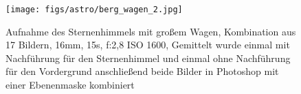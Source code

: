 \begin{figure}
\centering
\texttt{[image: figs/astro/berg\_wagen\_2.jpg]}
\caption{Aufnahme des Sternenhimmels mit großem Wagen, Kombination aus 17 Bildern, 16mm, 15s, f:2,8 ISO 1600, Gemittelt wurde einmal mit Nachführung für den Sternenhimmel und einmal ohne Nachführung für den Vordergrund  anschließend beide Bilder in Photoshop mit einer Ebenenmaske kombiniert}
\end{figure}
\clearpage